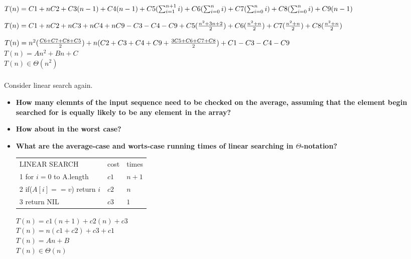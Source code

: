 \documentclass[a4paper,12pt]{article}
\begin{document}
\begin{itemize}
     
     
      $ T(n) = C1 + nC2 + C3(n-1) + C4(n-1) + C5(\sum_{i=1}^{n+1} i) \\     
	+  C6(\sum_{i=0}^{n} i) + C7(\sum_{i=0}^{n} i) + C8(\sum_{i=0}^{n} i) + C9(n-1)	\\
    $
	
	$T(n) = C1 + nC2 + nC3 + nC4 + nC9 - C3 - C4 - C9 + C5(\frac{n^2+3n+2}{2}) \\
         +  C6(\frac{n^2+n}{2}) + C7(\frac{n^2+n}{2}) + C8(\frac{n^2+n}{2})   \\
    $
     
     $ T(n) = n^2(\frac{C6+C7+C8+C5}{2}) + n(C2+C3+C4+C9 + \frac{3C5+C6+C7+C8}{2}) \\
       + C1 - C3 - C4 - C9$ \\
      
      $ T(n) = An^2 + Bn + C$ \\
  
      $T(n) \in \Theta(n^2)$
    \end{itemize}
    
    \subsubsection{} Consider linear search again.
    
    \begin{itemize}
     \item \textbf {How many elemnts of the input sequence need to be checked on the
     average, assuming that the element begin searched for is equally likely to be any element
     in the array?}
     
     \item \textbf{How about in the worst case?}
     
     \item \textbf{What are the average-case and worts-case running
     times of linear searching in $\Theta$-notation?}
     
     \begin{tabular}{l l l}
      LINEAR SEARCH & cost & times \\
      1 for $i = 0$ to A.length & $c1$ & $n + 1$ \\
      2 \hspace{0.5cm} if($A[i] == v$) return $i$ & $c2$ & $n$ \\
      3 return NIL & $c3$ & $1$ \\
     \end{tabular}
     
     $ T(n) = c1(n + 1) + c2(n) + c3 $ \\
     $ T(n) = n(c1 + c2) + c3 + c1 $\\
     $ T(n) = An + B  $\\
     $ T(n) \in \Theta(n) $

    \end{itemize}
    
\end{document}
